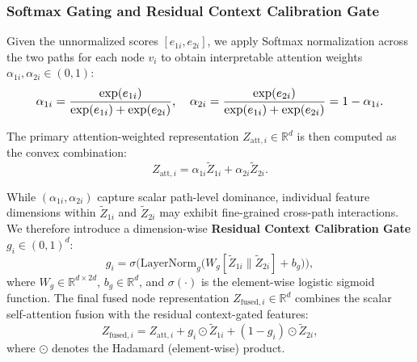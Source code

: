 \documentclass[10pt,a4paper,twocolumn]{article}
\begin{document}
\subsubsection{Softmax Gating and Residual Context Calibration Gate}

Given the unnormalized scores $[e_{1i}, e_{2i}]$, we apply Softmax normalization across the two paths for each node $v_i$ to obtain interpretable attention weights $\alpha_{1i}, \alpha_{2i} \in (0, 1)$:
\begin{equation}
  \resizebox{0.89\linewidth}{!}{$\displaystyle \alpha_{1i} = \frac{\exp(e_{1i})}{\exp(e_{1i}) + \exp(e_{2i})}, \quad \alpha_{2i} = \frac{\exp(e_{2i})}{\exp(e_{1i}) + \exp(e_{2i})} = 1 - \alpha_{1i}.$}
\end{equation}

The primary attention-weighted representation $Z_{\text{att},i} \in \mathbb{R}^d$ is then computed as the convex combination:
\begin{equation}
  Z_{\text{att},i} = \alpha_{1i} \tilde{Z}_{1i} + \alpha_{2i} \tilde{Z}_{2i}.
\end{equation}

While $(\alpha_{1i}, \alpha_{2i})$ capture scalar path-level dominance, individual feature dimensions within $\tilde{Z}_{1i}$ and $\tilde{Z}_{2i}$ may exhibit fine-grained cross-path interactions. We therefore introduce a dimension-wise \textbf{Residual Context Calibration Gate} $g_i \in (0, 1)^d$:
\begin{equation}
  g_i = \sigma\Big(\text{LayerNorm}_g\big(W_g [\tilde{Z}_{1i} \parallel \tilde{Z}_{2i}] + b_g\big)\Big),
\end{equation}
where $W_g \in \mathbb{R}^{d \times 2d}$, $b_g \in \mathbb{R}^d$, and $\sigma(\cdot)$ is the element-wise logistic sigmoid function. The final fused node representation $Z_{\text{fused},i} \in \mathbb{R}^d$ combines the scalar self-attention fusion with the residual context-gated features:
\begin{equation}
  Z_{\text{fused},i} = Z_{\text{att},i} + g_i \odot \tilde{Z}_{1i} + (1 - g_i) \odot \tilde{Z}_{2i},
\end{equation}
where $\odot$ denotes the Hadamard (element-wise) product.
\end{document}
